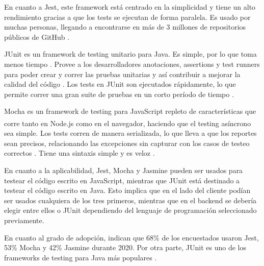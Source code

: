 \documentclass{article}
\begin{document}
En cuanto a Jest, este framework está centrado en la simplicidad y tiene un alto rendimiento gracias a que los tests se ejecutan de forma paralela. Es usado por muchas personas, llegando a encontrarse en más de 3 millones de repositorios públicos de GitHub \parencite{jestOfficial}.

JUnit es un framework de testing unitario para Java. Es simple, por lo que toma menos tiempo \parencite{tutorialsPointJUnit}. Provee a los desarrolladores anotaciones, assertions y test runners para poder crear y correr las pruebas unitarias y así contribuir a mejorar la calidad del código \parencite{simplilearnJUnit}. Los tests en JUnit son ejecutados rápidamente, lo que permite correr una gran suite de pruebas en un corto período de tiempo \parencite{codeIntelligenceJUnit}.

Mocha es un framework de testing para JavaScript repleto de características que corre tanto en Node.js\textsuperscript{\textregistered} como en el navegador, haciendo que el testing asíncrono sea simple. Los tests corren de manera serializada, lo que lleva a que los reportes sean precisos, relacionando las excepciones sin capturar con los casos de testeo correctos \parencite{mochaHome}. Tiene una sintaxis simple y es veloz \parencite{mindkTesting}.

En cuanto a la aplicabilidad, Jest, Mocha y Jasmine pueden ser usados para testear el código escrito en JavaScript, mientras que JUnit está destinado a testear el código escrito en Java. Esto implica que en el lado del cliente podían ser usados cualquiera de los tres primeros, mientras que en el backend se debería elegir entre ellos o JUnit dependiendo del lenguaje de programación seleccionado previamente.

En cuanto al grado de adopción, \textcite{stateofjsTesting} indican que 68\% de los encuestados usaron Jest, 53\% Mocha y 42\% Jasmine durante 2020. Por otra parte, JUnit es uno de los frameworks de testing para Java más populares \parencite{headspinJUnit}.
\end{document}
